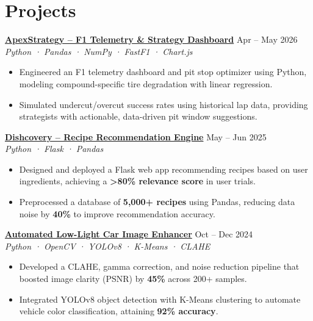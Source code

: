 \documentclass[10pt, letterpaper]{article}
\begin{document}
\section{Projects}

\href{https://github.com/akhiakshith/apexstrategy}{\textbf{ApexStrategy – F1 Telemetry \& Strategy Dashboard}} \hfill {\small\color{light}Apr – May 2026}\\[-1pt]
{\small\color{light}\textit{Python · Pandas · NumPy · FastF1 · Chart.js}}
\begin{itemize}
  \item Engineered an F1 telemetry dashboard and pit stop optimizer using Python, modeling compound-specific tire degradation with linear regression.
  \item Simulated undercut/overcut success rates using historical lap data, providing strategists with actionable, data-driven pit window suggestions.
\end{itemize}

\vspace{-1.5pt}
\href{https://github.com/akhiakshith/Dishcovery}{\textbf{Dishcovery – Recipe Recommendation Engine}} \hfill {\small\color{light}May – Jun 2025}\\[-1pt]
{\small\color{light}\textit{Python · Flask · Pandas}}
\begin{itemize}
  \item Designed and deployed a Flask web app recommending recipes based on user ingredients, achieving a \textbf{>80\% relevance score} in user trials.
  \item Preprocessed a database of \textbf{5,000+ recipes} using Pandas, reducing data noise by \textbf{40\%} to improve recommendation accuracy.
\end{itemize}

\vspace{-1.5pt}
\href{https://github.com/akhiakshith/Automated-Low-Light-Car-Image-Enhancer-}{\textbf{Automated Low-Light Car Image Enhancer}} \hfill {\small\color{light}Oct – Dec 2024}\\[-1pt]
{\small\color{light}\textit{Python · OpenCV · YOLOv8 · K-Means · CLAHE}}
\begin{itemize}
  \item Developed a CLAHE, gamma correction, and noise reduction pipeline that boosted image clarity (PSNR) by \textbf{45\%} across 200+ samples.
  \item Integrated YOLOv8 object detection with K-Means clustering to automate vehicle color classification, attaining \textbf{92\% accuracy}.
\end{itemize}
\end{document}
